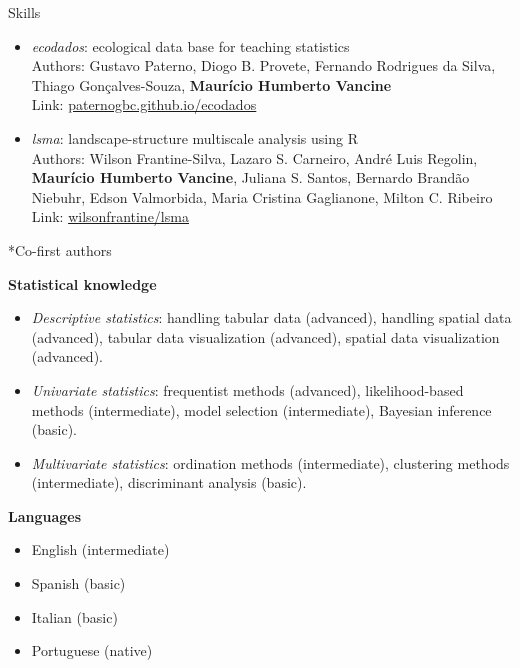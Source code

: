 \documentclass{resume}
\begin{document}
\begin{rSection}{Skills}
\begin{itemize}
\item {\it ecodados}: ecological data base for teaching statistics\\
Authors: Gustavo Paterno, Diogo B. Provete, Fernando Rodrigues da Silva, Thiago Gonçalves-Souza, {\bf Maurício Humberto Vancine}\\
Link: \href{https://paternogbc.github.io/ecodados/}{\underline{paternogbc.github.io/ecodados}}

\item {\it lsma}: landscape-structure multiscale analysis using R\\
Authors: Wilson Frantine-Silva, Lazaro S. Carneiro, André Luis Regolin, {\bf Maurício Humberto Vancine}, Juliana S. Santos, Bernardo Brandão Niebuhr, Edson Valmorbida, Maria Cristina Gaglianone, Milton C. Ribeiro\\
Link: \href{https://github.com/wilsonfrantine/landscapeDecoupler}{\underline{wilsonfrantine/lsma}}

\end{itemize} 

*Co-first authors

{\bf Statistical knowledge}

\begin{itemize} 
\item {\it Descriptive statistics}: handling tabular data (advanced), handling spatial data (advanced), tabular data visualization (advanced), spatial data visualization (advanced).

\item {\it Univariate statistics}: frequentist methods (advanced), likelihood-based methods (intermediate), model selection (intermediate), Bayesian inference (basic).

\item {\it Multivariate statistics}: ordination methods (intermediate), clustering methods (intermediate), discriminant analysis (basic).
\end{itemize}

{\bf Languages}
\begin{itemize}
\item English (intermediate)
\item Spanish (basic)
\item Italian (basic)
\item Portuguese (native)
\end{itemize}

\end{rSection}

\end{document}

